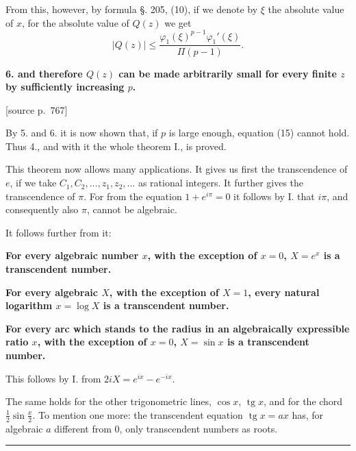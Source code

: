 \documentclass[11pt]{article}
\newcommand{\srcpage}[1]{\par\medskip\noindent\textsf{[source p.~#1]}\par\smallskip}
\newcommand{\abs}[1]{\left|#1\right|}
\DeclareMathOperator{\tg}{tg}
\begin{document}
From this, however, by formula §. 205, (10), if we denote by $\xi$ the absolute value of $x$, for the absolute value of $Q(z)$ we get
\[
\abs{Q(z)}\leq \frac{\varphi_1(\xi)^{p-1}\varphi_1'(\xi)}{\Pi(p-1)}.
\]

\textbf{6. and therefore $Q(z)$ can be made arbitrarily small for every finite $z$ by sufficiently increasing $p$.}

\srcpage{767}
By 5. and 6. it is now shown that, if $p$ is large enough, equation (15) cannot hold. Thus 4., and with it the whole theorem I., is proved.

This theorem now allows many applications. It gives us first the transcendence of $e$, if we take $C_1,C_2,\ldots,z_1,z_2,\ldots$ as rational integers. It further gives the transcendence of $\pi$. For from the equation $1+e^{i\pi}=0$ it follows by I. that $i\pi$, and consequently also $\pi$, cannot be algebraic.

It follows further from it:

\begin{center}
\textbf{For every algebraic number $x$, with the exception of $x=0$, $X=e^x$ is a transcendent number.}

\textbf{For every algebraic $X$, with the exception of $X=1$, every natural logarithm $x=\log X$ is a transcendent number.}

\textbf{For every arc which stands to the radius in an algebraically expressible ratio $x$, with the exception of $x=0$, $X=\sin x$ is a transcendent number.}
\end{center}

This follows by I. from $2iX=e^{ix}-e^{-ix}$.

The same holds for the other trigonometric lines, $\cos x$, $\tg x$, and for the chord $\frac12\sin\frac{x}{2}$. To mention one more: the transcendent equation $\tg x=ax$ has, for algebraic $a$ different from 0, only transcendent numbers as roots.

\bigskip
\begin{center}\rule{0.28\linewidth}{0.4pt}\end{center}
\end{document}
